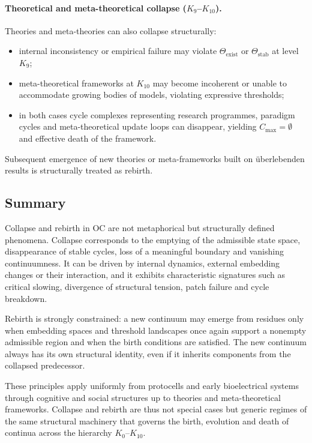 \paragraph{Theoretical and meta-theoretical collapse (\texorpdfstring{\(K_9\)}{K_9}–\(K_{10}\)).}
Theories and meta-theories can also collapse structurally:
\begin{itemize}
  \item internal inconsistency or empirical failure may violate
        \(\Theta_{\mathrm{exist}}\) or \(\Theta_{\mathrm{stab}}\) at level
        \(K_9\);
  \item meta-theoretical frameworks at \(K_{10}\) may become incoherent or
        unable to accommodate growing bodies of models, violating expressive
        thresholds;
  \item in both cases cycle complexes representing research programmes,
        paradigm cycles and meta-theoretical update loops can disappear,
        yielding \(C_{\max}=\emptyset\) and effective death of the framework.
\end{itemize}
Subsequent emergence of new theories or meta-frameworks built on überlebenden
results is structurally treated as rebirth.

\subsection{Summary}

Collapse and rebirth in OC are not metaphorical but structurally defined
phenomena. Collapse corresponds to the emptying of the admissible state
space, disappearance of stable cycles, loss of a meaningful boundary and
vanishing continuumness. It can be driven by internal dynamics, external
embedding changes or their interaction, and it exhibits characteristic
signatures such as critical slowing, divergence of structural tension, patch
failure and cycle breakdown.

Rebirth is strongly constrained: a new continuum may emerge from residues only
when embedding spaces and threshold landscapes once again support a nonempty
admissible region and when the birth conditions are satisfied. The new
continuum always has its own structural identity, even if it inherits
components from the collapsed predecessor.

These principles apply uniformly from protocells and early bioelectrical
systems through cognitive and social structures up to theories and
meta-theoretical frameworks. Collapse and rebirth are thus not special
cases but generic regimes of the same structural machinery that governs the
birth, evolution and death of continua across the hierarchy \(K_0\)–\(K_{10}\).
